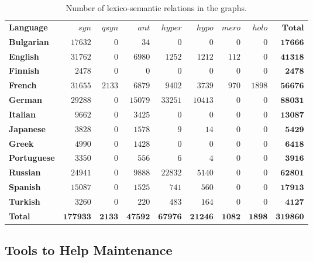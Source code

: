 \documentclass[10pt, a4paper]{article}
\begin{document}
\begin{table}[htb]
\begin{center}
\begin{small}
\begin{tabular}{lrrrrrrrr}
\hline
\textbf{Language} & $syn$ & $qsyn$ & $ant$ & $hyper$ & $hypo$ & $mero$ & $holo$ & $\mathbf{Total}$ \\
\textbf{Bulgarian} & $17632$ & $0$ & $34$ & $0$ & $0$ & $0$ & $0$ & $\mathbf{17666}$ \\
\textbf{English} & $31762$ & $0$ & $6980$ & $1252$ & $1212$ & $112$ & $0$ & $\mathbf{41318}$ \\
\textbf{Finnish} & $2478$ & $0$ & $0$ & $0$ & $0$ & $0$ & $0$ & $\mathbf{2478}$ \\
\textbf{French} & $31655$ & $2133$ & $6879$ & $9402$ & $3739$ & $970$ & $1898$ & $\mathbf{56676}$ \\
\textbf{German} & $29288$ & $0$ & $15079$ & $33251$ & $10413$ & $0$ & $0$ & $\mathbf{88031}$ \\
\textbf{Italian} & $9662$ & $0$ & $3425$ & $0$ & $0$ & $0$ & $0$ & $\mathbf{13087}$ \\
\textbf{Japanese} & $3828$ & $0$ & $1578$ & $9$ & $14$ & $0$ & $0$ & $\mathbf{5429}$ \\
\textbf{Greek} & $4990$ & $0$ & $1428$ & $0$ & $0$ & $0$ & $0$ & $\mathbf{6418}$ \\
\textbf{Portuguese} & $3350$ & $0$ & $556$ & $6$ & $4$ & $0$ & $0$ & $\mathbf{3916}$ \\
\textbf{Russian} & $24941$ & $0$ & $9888$ & $22832$ & $5140$ & $0$ & $0$ & $\mathbf{62801}$ \\
\textbf{Spanish} & $15087$ & $0$ & $1525$ & $741$ & $560$ & $0$ & $0$ & $\mathbf{17913}$ \\
\textbf{Turkish} & $3260$ & $0$ & $220$ & $483$ & $164$ & $0$ & $0$ & $\mathbf{4127}$ \\
\textbf{Total} & $\mathbf{177933}$ & $\mathbf{2133}$ & $\mathbf{47592}$ & $\mathbf{67976}$ & $\mathbf{21246}$ & $\mathbf{1082}$ & $\mathbf{1898}$ & $\mathbf{319860}$ \\
\end{tabular}
\end{small}
\end{center}
\caption{Number of lexico-semantic relations in the graphs.}
\label{table:rels}
\end{table}

\subsection{Tools to Help Maintenance}
\end{document}
